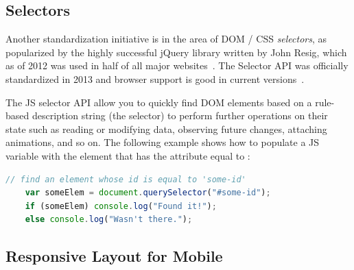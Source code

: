 \subsection{Selectors}
\label{sec:bgselectors}
Another standardization initiative is in the area of DOM / CSS \textit{selectors},
as popularized by the highly successful jQuery library
written by John Resig, 
which as of 2012 was used in half of all major websites~\cite{matthiasgelbmann2012}.
The Selector API was officially standardized in 2013 and browser support is good in current versions~\cite{w3ccontributors2013}.

The JS selector API allow you to quickly find DOM elements based on a rule-based description string (the selector) to perform further operations on their state such as reading or modifying data, observing future changes, attaching animations, and so on. 
The following example shows how to populate a JS variable with the element that has the  attribute equal to :

\begin{lstlisting}[language=JavaScript,caption={JavaScript query selector example.}]
	// find an element whose id is equal to 'some-id'
	var someElem = document.querySelector("#some-id");
	if (someElem) console.log("Found it!");
	else console.log("Wasn't there.");
\end{lstlisting}










\subsection{Responsive Layout for Mobile}

